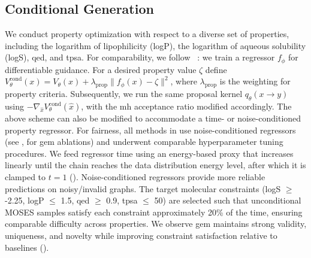 \subsection{Conditional Generation}
We conduct property optimization with respect to a diverse set of properties, including the logarithm of lipophilicity (logP), the logarithm of aqueous solubility (logS), \gls{qed}, and \gls{tpsa}. For comparability, we follow  ~\citep{vignac2022digress, ninniri2025graph}: we train a regressor \(f_\phi\) for differentiable guidance. For a desired property value $\zeta$ define \(V_\theta^{\mathrm{cond}}(x)=V_\theta(x)+\lambda_{\mathrm{prop}}\|f_\phi(x)-\zeta\|^2\), where $\lambda_{\mathrm{prop}}$ is the weighting for property criteria. Subsequently, we run the same proposal kernel $q_\theta(x\!\to\!y)$ using \(-\nabla_{\hat{x}} V_\theta^{\mathrm{cond}}(\hat{x})\),
with the \gls{mh} acceptance ratio modified accordingly. The above scheme can also be modified to accommodate a time- or noise-conditioned property regressor. For fairness, all methods in  use noise-conditioned regressors (see ,  for \gls{gem} ablations) and underwent comparable hyperparameter tuning procedures. We feed regressor time using an energy-based proxy that increases linearly until the chain reaches the data distribution energy level, after which it is clamped to $t=1$ (). Noise-conditioned regressors provide more reliable predictions on noisy/invalid graphs. The target molecular constraints (logS $\ge$ -2.25, logP $\le$ 1.5, \gls{qed} $\ge$ 0.9, \gls{tpsa} $\le$ 50) are selected such that unconditional MOSES samples satisfy each constraint approximately 20\% of the time, ensuring comparable difficulty across properties.
We observe \gls{gem} maintains strong validity, uniqueness, and novelty while improving constraint satisfaction relative to baselines ().


